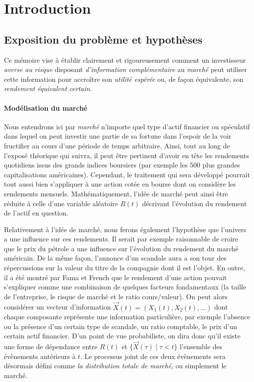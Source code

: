 \section{Introduction}

\subsection{Exposition du problème et hypothèses}

Ce mémoire vise à établir clairement et rigoureusement comment un investisseur
\textit{averse au risque} disposant \textit{d'information complémentaire} au
\textit{marché} peut utiliser cette information pour accroître son \textit{utilité
  espérée} ou, de façon équivalente, son \textit{rendement équivalent certain}.

\paragraph{Modélisation du marché}

Nous entendrons ici par \textit{marché} n'importe quel type d'actif financier ou
spéculatif dans lequel on peut investir une partie de sa fortune dans l'espoir de la voir
fructifier au cours d'une période de temps arbitraire. Ainsi, tout au long de l'exposé
théorique qui suivra, il peut être pertinent d'avoir en tête les rendements quotidiens
issus des grands indices boursiers (par exemple les 500 plus grandes capitalisations
américaines). Cependant, le traitement qui sera développé pourrait tout aussi bien
s'appliquer à une action cotée en bourse dont on considère les rendements mensuels.\nec
Mathématiquement, l'idée de marché peut ainsi être réduite à celle d'une variable
aléatoire $R(t)$ décrivant l'évolution du rendement de l'actif en question.

Relativement à l'idée de marché, nous ferons également l'hypothèse que l'univers a une
influence sur ces rendements. Il serait par exemple raisonnable de croire que le prix du
pétrole a une influence sur l'évolution du rendement du marché américain. De la même
façon, l'annonce d'un scandale aura a son tour des répercussions sur la valeur du titre de
la compagnie dont il est l'objet. En outre, il a été montré par Fama et French que le
rendement d'une action pouvait s'expliquer comme une combinaison de quelques facteurs
fondamentaux (la taille de l'entreprise, le risque de marché et le ratio cours/valeur). On
peut alors considérer un vecteur d'information $\vec X(t) = (X_1(t), X_2(t), \dots)$ dont
chaque composante représente une information particulière, par exemple l'absence ou la
présence d'un certain type de scandale, un ratio comptable, le prix d'un certain actif
financier\reph. D'un point de vue probabiliste, on dira donc qu'il existe une forme de
dépendance entre $R(t)$ et $\{\vec X(\tau) \mid \tau < t\}$ l'ensemble des évènements antérieurs à
$t$. Le processus joint de ces deux évènements sera désormais défini comme \textit{la
  distribution totale de marché}, ou simplement le marché.


